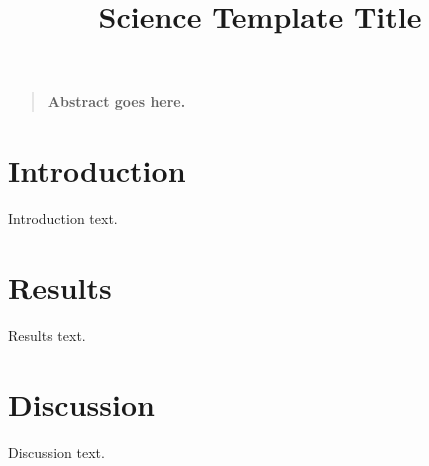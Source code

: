 \documentclass[12pt]{article}
\title{Science Template Title}
\author
{Author Name$^{1\ast}$\
\
\normalsize{$^{1} of Chemistry, University of Nowhere,}\
\normalsize{123 Main St, Anytown, ST 12345, USA}\
\
\normalsize{$^\ast whom correspondence should be addressed; E-mail:  author@nowhere.edu.}
}
\date{}
\newenvironment{sciabstract}{%
\begin{quote} \bf}
{\end{quote}}
\begin{document}
 

\baselineskip24pt

\maketitle 

\begin{sciabstract}
  Abstract goes here.
\end{sciabstract}

\section*{Introduction}
Introduction text.

\section*{Results}
Results text.

\section*{Discussion}
Discussion text.



\end{document}

